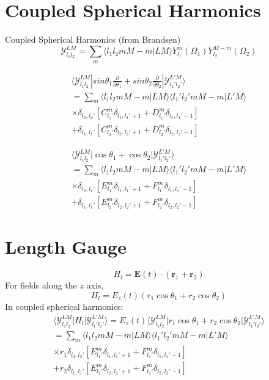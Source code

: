 \documentclass[a4paper,12pt]{article}
\newcommand{\innerprod}[2]{\langle #1 | #2 \rangle}
\newcommand{\matelem}[3]{\langle #1 | #2 | #3 \rangle}
\newcommand{\cg}[6]{\innerprod{#1 #2 #3 #4}{#5 #6}}
\newcommand{\partialdiff}[2]{\frac{\partial #1}{\partial #2}}
\renewcommand{\vec}[1]{\ensuremath{\textbf{#1}}}
\begin{document}
\section{Coupled Spherical Harmonics}
Coupled Spherical Harmonics (from Brandsen)
\begin{equation}
	\label{eqn:coupled-sph}
	\mathcal{Y}_{l_1 l_2}^{LM} = \sum_m \cg{l_1}{l_2}{m}{M-m}{L}{M}
Y_{l_1}^m(\Omega_1) Y_{l_2}^{M-m}(\Omega_2) 
\end{equation}

\begin{eqnarray}
  \matelem
	{\mathcal{Y}_{l_1 l_2}^{LM}}
	{sin \theta_1 \partialdiff{}{\theta_1}
	+sin \theta_2 \partialdiff{}{\theta_2}}
	{\mathcal{Y}_{l_1' l_2'}^{L'M}}
	\\ =
   \sum_m
	\cg{l_1}{l_2}{m}{M-m}{L}{M}
	\cg{l_1'}{l_2'}{m}{M-m}{L'}{M} \\
	\times \delta_{l_2, l_2'} \left[ 
		C_{l_1'}^m \delta_{l_1, l_1'+1} 
		+ D_{l_1'}^m \delta_{l_1, l_1'-1}  \right] \\
	+ \delta_{l_1, l_1'} \left[ 
		C_{l_2'}^m \delta_{l_2, l_2'+1} 
		+ D_{l_2'}^m \delta_{l_2, l_2'-1}  \right]
\end{eqnarray}

\begin{eqnarray}
  \matelem
	{\mathcal{Y}_{l_1 l_2}^{LM}}
	{\cos \theta_1 + \cos \theta_2}
	{\mathcal{Y}_{l_1' l_2'}^{L'M}} \\ = 
   \sum_m
	\cg{l_1}{l_2}{m}{M-m}{L}{M}
	\cg{l_1'}{l_2'}{m}{M-m}{L'}{M} \\
	\times \delta_{l_2, l_2'} \left[ 
		E_{l_1'}^m \delta_{l_1, l_1'+1} 
		+ F_{l_1'}^m \delta_{l_1, l_1'-1}  \right] \\
	+ \delta_{l_1, l_1'} \left[ 
		E_{l_2'}^m \delta_{l_2, l_2'+1} 
		+ F_{l_2'}^m \delta_{l_2, l_2'-1}  \right]
\end{eqnarray}


\section{Length Gauge}

\begin{equation}
 	H_l = \vec{E}(t) \cdot (\vec{r}_1 + \vec{r}_2)
\end{equation}
For fields along the $z$ axis, 
\begin{equation}
	H_l = E_z(t) (r_1 \cos \theta_1 + r_2 \cos \theta_2)
\end{equation}
In coupled spherical harmonics:
\begin{eqnarray}
   \matelem
	{\mathcal{Y}_{l_1 l_2}^{LM}}
	{H_l}
	{\mathcal{Y}_{l_1' l_2'}^{L'M}} = E_z(t) 
    \matelem
	{\mathcal{Y}_{l_1 l_2}^{LM}}
	{r_1 \cos \theta_1 + r_2 \cos \theta_2}
	{\mathcal{Y}_{l_1' l_2'}^{L'M}} \\ =
   \sum_m
	\cg{l_1}{l_2}{m}{M-m}{L}{M}
	\cg{l_1'}{l_2'}{m}{M-m}{L'}{M} \\
	\times r_1 \delta_{l_2, l_2'} \left[ 
		E_{l_1'}^m \delta_{l_1, l_1'+1} 
		+ F_{l_1'}^m \delta_{l_1, l_1'-1}  \right] \\
	+ r_2 \delta_{l_1, l_1'} \left[ 
		E_{l_2'}^m \delta_{l_2, l_2'+1} 
		+ F_{l_2'}^m \delta_{l_2, l_2'-1}  \right]
\end{eqnarray}
\end{document}
